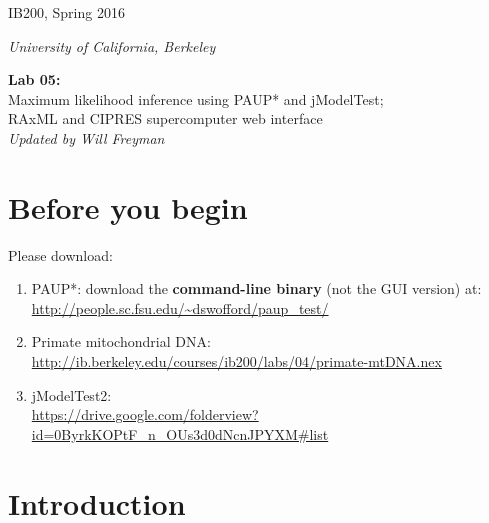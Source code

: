 \documentclass[11pt]{article}
\begin{document}
\noindent
\large
\begin{minipage}{0.5\textwidth}
\begin{flushleft} 
IB200, Spring 2016
\end{flushleft}
\end{minipage}
\begin{minipage}{0.5\textwidth}
\begin{flushright} 
\textit{University of California, Berkeley}
\end{flushright}
\end{minipage}

\vspace{0.5cm}


\begin{center}
\Large \textbf{Lab 05:} \\
Maximum likelihood inference using PAUP* and jModelTest; \\ 
RAxML and CIPRES supercomputer web interface \\
\normalsize
\textit{Updated by Will Freyman}
\end{center}

\vspace{0.5cm}

\section{Before you begin}

Please download:

\begin{enumerate}
  \item PAUP*: download the \textbf{command-line binary} (not the GUI version) at: \\ 
        \url{http://people.sc.fsu.edu/~dswofford/paup_test/}
  \item Primate mitochondrial DNA: \\
        \url{http://ib.berkeley.edu/courses/ib200/labs/04/primate-mtDNA.nex}
  \item jModelTest2: \\ 
        \url{https://drive.google.com/folderview?id=0ByrkKOPtF_n_OUs3d0dNcnJPYXM#list}
\end{enumerate}


\section{Introduction}
\end{document}
